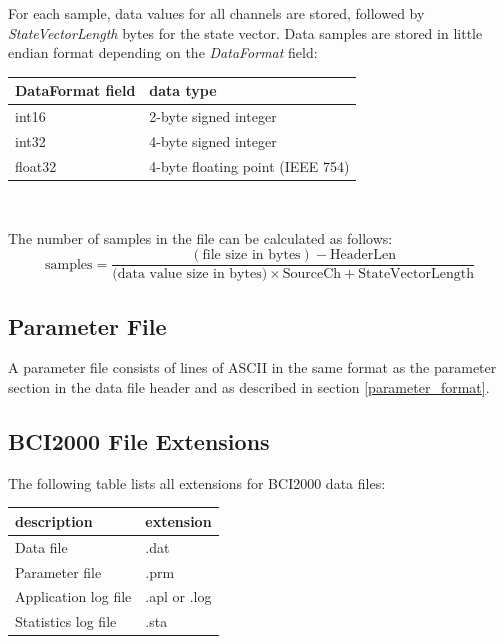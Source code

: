 \documentclass[letterpaper,oneside,12pt]{book}
\begin{document}
For each sample, data values for all channels are stored, followed by \textit{StateVectorLength} bytes for the state vector.
Data samples are stored in little endian format depending on the \textit{DataFormat} field:
\begin{center}
 \begin{tabular}{|l|l|}\hline
  \textbf{DataFormat field} & \textbf{data type} \\ \hline 
  int16 & 2-byte signed integer \\
  int32 & 4-byte signed integer \\
  float32 & 4-byte floating point (IEEE 754) \\ \hline 
 \end{tabular}\\
\end{center}
The number of samples in the file can be calculated as follows: 
$$
  \textrm{samples}
    =\frac{(\textrm{file size in bytes})-\textrm{HeaderLen}}
    {\textrm{(data value size in bytes)}\times\textrm{SourceCh}+\textrm{StateVectorLength}}
$$

\subsection{Parameter File}

A parameter file consists of lines of ASCII in the same format as the parameter section in the data file header and as described in section \ref{parameter_format}.

\newpage
\subsection{BCI2000 File Extensions}

The following table lists all extensions for BCI2000 data files:
\vspace{0.5cm}\\
\begin{centering}
 \centering
 \begin{tabular}{|l|l|}
  \hline
  \textbf{description} & \textbf{extension} \\
  \hline
  Data file & .dat \\
  \hline
  Parameter file & .prm \\
  \hline
  Application log file & .apl or .log \\
  \hline
  Statistics log file & .sta \\
  \hline
 \end{tabular}
\end{centering}   
\end{document}
